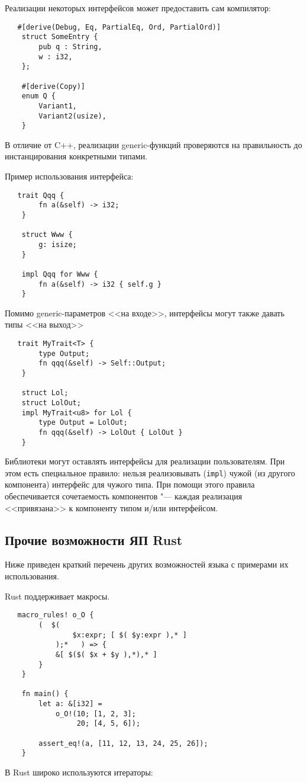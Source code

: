 \documentclass[10pt, a5paper]{article}
\begin{document}
Реализации некоторых интерфейсов может предоставить сам компилятор:

\begin{verbatim}
   #[derive(Debug, Eq, PartialEq, Ord, PartialOrd)]
    struct SomeEntry {
        pub q : String,
        w : i32,
    };
    
    #[derive(Copy)]
    enum Q {
        Variant1,
        Variant2(usize),
    }\end{verbatim}
В отличие от C++, реализации generic-функций проверяются на правильность до инстанцирования конкретными типами.

Пример использования интерфейса:

\begin{verbatim}
   trait Qqq {
        fn a(&self) -> i32;
    }
    
    struct Www {
        g: isize;
    }
    
    impl Qqq for Www {
        fn a(&self) -> i32 { self.g }
    }\end{verbatim}
Помимо generic-параметров <<на входе>>, интерфейсы могут также давать типы <<на выход>>

\begin{verbatim}
   trait MyTrait<T> {
        type Output;
        fn qqq(&self) -> Self::Output;
    }
    
    struct Lol;
    struct LolOut;
    impl MyTrait<u8> for Lol {
        type Output = LolOut;
        fn qqq(&self) -> LolOut { LolOut }
    }\end{verbatim}
Библиотеки могут оставлять интерфейсы для реализации пользователям. При этом есть специальное правило: нельзя реализовывать (\verb!impl!) чужой (из другого компонента) интерфейс для чужого типа. При помощи этого правила обеспечивается сочетаемость компонентов "--- каждая реализация <<привязана>> к компоненту типом и/или интерфейсом.

\subsection*{Прочие возможности ЯП Rust}

Ниже приведен краткий перечень других возможностей языка с примерами их использования.

Rust поддерживает макросы.

\begin{verbatim}
   macro_rules! o_O {
        (  $(
                $x:expr; [ $( $y:expr ),* ]
            );*   ) => {
            &[ $($( $x + $y ),*),* ]
        }
    }
    
    fn main() {
        let a: &[i32] = 
            o_O!(10; [1, 2, 3];
                 20; [4, 5, 6]);
    
        assert_eq!(a, [11, 12, 13, 24, 25, 26]); 
    }\end{verbatim}
В Rust широко используются итераторы:
\end{document}
